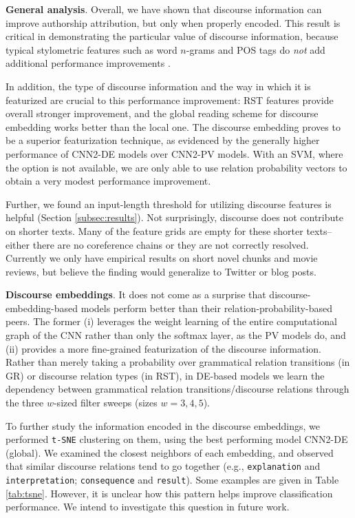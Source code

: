 \textbf{General analysis}.
Overall, we have  shown that discourse information can improve authorship attribution, but only when properly encoded.
This result is critical in demonstrating the particular value of discourse information, because typical stylometric features such as word $n$-grams and POS tags do {\it not} add additional performance improvements \citep{Ruder:2016,Sari:2017}.

In addition, the type of discourse information and the way in which it is featurized are crucial to this performance improvement:
RST features provide overall stronger improvement, and the global reading scheme for discourse embedding works better than the local one.
The discourse embedding proves to be a superior featurization technique, as evidenced by the generally higher performance of CNN2-DE models over CNN2-PV models.
With an SVM, where the option is not available, we are only able to use relation probability vectors to obtain a very modest performance improvement. 

Further, we found an input-length threshold for utilizing discourse features is helpful (Section \ref{subsec:results}).
Not surprisingly, discourse does not contribute on shorter texts.
Many of the feature grids are empty for these shorter texts-- either there are no coreference chains or they are not correctly resolved. 
Currently we only have empirical results on short novel chunks and movie reviews, but believe the finding would generalize to Twitter or blog posts.
\medskip

\noindent
\textbf{Discourse embeddings}.
It does not come as a surprise that discourse-embedding-based models perform better than their relation-probability-based peers.
The former (i) leverages the weight learning of the entire computational graph of the CNN rather than only the softmax layer, as the PV models do, and (ii) provides a more fine-grained featurization of the discourse information. Rather than merely taking a probability over grammatical relation transitions (in GR) or discourse relation types (in RST), in DE-based models we learn the dependency between grammatical relation transitions/discourse relations through the three $w$-sized filter sweeps (sizes $w=3,4,5$). 

To further study the information encoded in the discourse embeddings, we performed \texttt{t-SNE} clustering \cite{vanDerMaaten:2008} on them, using the best performing model CNN2-DE (global). We examined the closest neighbors of each embedding, and observed that similar discourse relations tend to go together (e.g., \texttt{explanation} and \texttt{interpretation}; \texttt{consequence} and \texttt{result}). Some examples are given in Table \ref{tab:tsne}.
However, it is unclear how this pattern helps improve classification performance.
We intend to investigate this question in future work.
\medskip

